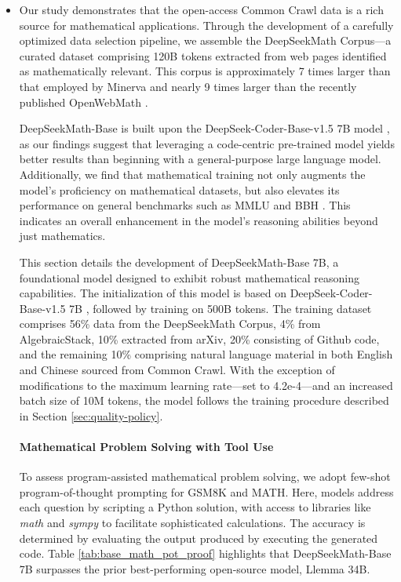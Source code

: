 \begin{itemize}[topsep=0pt]
    \item Our study demonstrates that the open-access Common Crawl data is a rich source for mathematical applications. Through the development of a carefully optimized data selection pipeline, we assemble the DeepSeekMath Corpus—a curated dataset comprising 120B tokens extracted from web pages identified as mathematically relevant. This corpus is approximately 7 times larger than that employed by Minerva \citep{minerva} and nearly 9 times larger than the recently published OpenWebMath \citep{openwebmath}.

DeepSeekMath-Base is built upon the DeepSeek-Coder-Base-v1.5 7B model \citep{deepseek-coder}, as our findings suggest that leveraging a code-centric pre-trained model yields better results than beginning with a general-purpose large language model. Additionally, we find that mathematical training not only augments the model’s proficiency on mathematical datasets, but also elevates its performance on general benchmarks such as MMLU \citep{mmlu} and BBH \citep{bbh}. This indicates an overall enhancement in the model's reasoning abilities beyond just mathematics.

This section details the development of DeepSeekMath-Base 7B, a foundational model designed to exhibit robust mathematical reasoning capabilities. The initialization of this model is based on DeepSeek-Coder-Base-v1.5 7B \citep{deepseek-coder}, followed by training on 500B tokens. The training dataset comprises 56\% data from the DeepSeekMath Corpus, 4\% from AlgebraicStack, 10\% extracted from arXiv, 20\% consisting of Github code, and the remaining 10\% comprising natural language material in both English and Chinese sourced from Common Crawl. With the exception of modifications to the maximum learning rate—set to 4.2e-4—and an increased batch size of 10M tokens, the model follows the training procedure described in Section \ref{sec:quality-policy}.

\paragraph{Mathematical Problem Solving with Tool Use} To assess program-assisted mathematical problem solving, we adopt few-shot program-of-thought prompting \citep{pot,pal} for GSM8K and MATH. Here, models address each question by scripting a Python solution, with access to libraries like \textit{math} and \textit{sympy} to facilitate sophisticated calculations. The accuracy is determined by evaluating the output produced by executing the generated code. Table \ref{tab:base_math_pot_proof} highlights that DeepSeekMath-Base 7B surpasses the prior best-performing open-source model, Llemma 34B.


\end{itemize}
